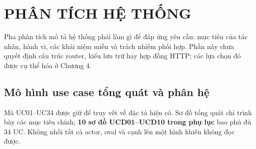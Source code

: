 \chapter{PHÂN TÍCH HỆ THỐNG}
Pha phân tích mô tả hệ thống phải làm gì để đáp ứng yêu cầu: mục tiêu của tác nhân, hành vi, các khái niệm miền và trách nhiệm phối hợp. Phần này chưa quyết định cấu trúc router, kiểu lưu trữ hay hợp đồng HTTP; các lựa chọn đó được cụ thể hóa ở Chương 4.

\section{Mô hình use case tổng quát và phân hệ}
Mã UC01--UC34 được giữ để truy vết về đặc tả hiện có. Sơ đồ tổng quát chỉ trình bày các mục tiêu chính; \textbf{10 sơ đồ UCD01--UCD10 trong phụ lục} bao phủ đủ 34 UC. Không nhồi tất cả actor, oval và cạnh lên một hình khiến không đọc được.


